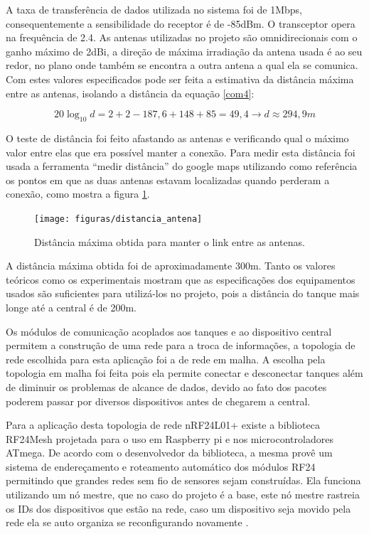 A taxa de transferência de dados utilizada no sistema foi de 1Mbps, consequentemente a sensibilidade do receptor é de -85dBm. O transceptor opera na frequência de 2.4. As antenas utilizadas no projeto são omnidirecionais com o ganho máximo de 2dBi, a direção de máxima irradiação da antena usada é ao seu redor, no plano onde também se encontra a outra antena a qual ela se comunica. Com estes valores especificados pode ser feita a estimativa da distância máxima entre as antenas, isolando a distância da equação \ref{com4}:

\begin{equation}
\label{com4}
	20 \log_{10} d = 2 + 2 - 187,6 + 148 + 85 = 49,4 \rightarrow d \approx 294,9 m
\end{equation}

O teste de distância foi feito afastando as antenas e verificando qual o máximo valor entre elas que era possível manter a conexão. Para medir esta distância foi usada a ferramenta “medir distância” do google maps utilizando como referência os pontos em que as duas antenas estavam localizadas quando perderam a conexão, como mostra a figura \ref{distancia_antena}.

\begin{figure}[h]
	\centering
	\texttt{[image: figuras/distancia\_antena]}
	\caption{Distância máxima obtida para manter o link entre as antenas.}
	\label{distancia_antena}
\end{figure}

A distância máxima obtida foi de aproximadamente 300m. Tanto os valores teóricos como os experimentais mostram que as especificações dos equipamentos usados são suficientes para utilizá-los no projeto, pois a distância do tanque mais longe até a central é de 200m.

Os módulos de comunicação acoplados aos tanques e ao dispositivo central permitem a construção de uma rede para a troca de informações, a topologia de rede escolhida para esta aplicação foi a de rede em malha. A escolha pela topologia em malha foi feita pois ela permite conectar e desconectar tanques além de diminuir os problemas de alcance de dados, devido ao fato dos pacotes poderem passar por diversos dispositivos antes de chegarem a central.

Para a aplicação desta topologia de rede nRF24L01+ existe a biblioteca RF24Mesh projetada para o uso em Raspberry pi e nos microcontroladores ATmega. De acordo com o desenvolvedor da biblioteca, a mesma provê um sistema de endereçamento e roteamento automático dos módulos RF24 permitindo que grandes redes sem fio de sensores sejam construídas. Ela funciona utilizando um nó mestre, que no caso do projeto é a base, este nó mestre rastreia os IDs dos dispositivos que estão na rede, caso um dispositivo seja movido pela rede ela se auto organiza se reconfigurando novamente \cite{meshnetwork}.

